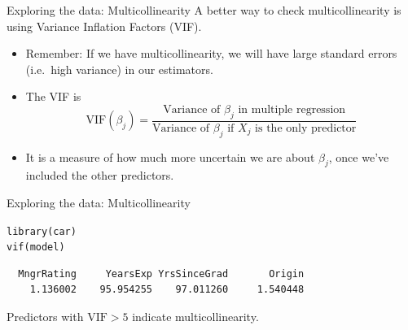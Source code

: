 \documentclass{beamer}\usepackage[]{graphicx}\usepackage[]{color}
\makeatletter
\newcommand{\hlopt}[1]{\textcolor[rgb]{1,0.894,0.769}{#1}}%
\newcommand{\hlstd}[1]{\textcolor[rgb]{1,0.894,0.769}{#1}}%
\newcommand{\hlkwd}[1]{\textcolor[rgb]{1,0.78,0.769}{#1}}%
\newenvironment{kframe}{%
 \def\at@end@of@kframe{}%
 \ifinner\ifhmode%
  \def\at@end@of@kframe{\end{minipage}}%
  \begin{minipage}{\columnwidth}%
 \fi\fi%
 \def\FrameCommand##1{\hskip\@totalleftmargin \hskip-\fboxsep
 \colorbox{shadecolor}{##1}\hskip-\fboxsep
     \hskip-\linewidth \hskip-\@totalleftmargin \hskip\columnwidth}%
 \MakeFramed {\advance\hsize-\width
   \@totalleftmargin\z@ \linewidth\hsize
   \@setminipage}}%
 {\par\unskip\endMakeFramed%
 \at@end@of@kframe}
\newenvironment{knitrout}{}{} %
\makeatother
\begin{document}
\begin{darkframes}

\begin{frame}[fragile]{Exploring the data: Multicollinearity}
      A better way to check multicollinearity is using Variance Inflation Factors (VIF).

      \begin{itemize}
      \item Remember: If we have multicollinearity, we will have large standard errors (i.e.\ high variance) in our estimators.
      \item The VIF is
      $$\mbox{VIF}(\beta_j) = \frac{\mbox{Variance of $\beta_j$ in multiple regression}}{\mbox{Variance of $\beta_j$ if $X_j$ is the only predictor}}$$
      \item It is a measure of how much more uncertain we are about $\beta_j$, once we've included the other predictors.
      \end{itemize}
\end{frame}
\begin{frame}[fragile]{Exploring the data: Multicollinearity}
\begin{knitrout}
\begin{kframe}
\begin{alltt}
\hlkwd{library}\hlstd{(car)}
\hlkwd{vif}\hlstd{(model)}
\end{alltt}
\begin{verbatim}
  MngrRating     YearsExp YrsSinceGrad       Origin 
    1.136002    95.954255    97.011260     1.540448 
\end{verbatim}
\end{kframe}
\end{knitrout}
      Predictors with $\text{VIF} > 5$ indicate multicollinearity.
      \pause  \bigskip


\end{frame}
\end{darkframes}
\end{document}
